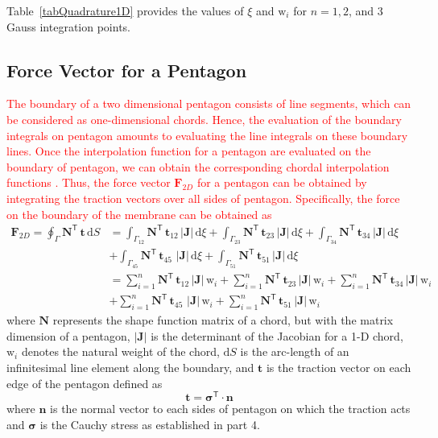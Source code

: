 Table~\ref{tabQuadrature1D} provides the values of $\xi$ and $\mathrm{w}_i$ for $n = 1, 2$, and $3$ Gauss integration points.

\subsection{Force Vector for a Pentagon}

\textcolor{red}{The boundary of a two dimensional pentagon consists of line segments, which can be considered as one-dimensional chords. Hence, the evaluation of the boundary integrals on pentagon amounts to evaluating the line integrals on these boundary lines. Once the interpolation function for a pentagon are evaluated on the boundary of pentagon, we can obtain the corresponding chordal interpolation functions \cite{Reddy93}.
    Thus, the force vector $\mathbf{F}_{2D}$  for a pentagon can be obtained by integrating the traction vectors over all sides of pentagon. Specifically, the force on the boundary of the membrane can be obtained as}
\begin{equation}
\begin{aligned}
\mathbf{F}_{2D}  = \oint_{\Gamma} \mathbf{N}^{\mathsf{T}} \, \mathbf{t} \, \mathrm{d} S & = \int_{\Gamma_{12}} \mathbf{N}^{\mathsf{T}} \, \mathbf{t}_{12} \,|\mathbf{J}| \, \mathrm{d} \xi + \int_{\Gamma_{23}} \mathbf{N}^{\mathsf{T}} \, \mathbf{t}_{23} \,|\mathbf{J}| \, \mathrm{d} \xi + \int_{\Gamma_{34}} \mathbf{N}^{\mathsf{T}} \, \mathbf{t}_{34} \,|\mathbf{J}| \, \mathrm{d} \xi \\
& + \int_{\Gamma_{45}} \mathbf{N}^{\mathsf{T}} \, \mathbf{t}_{45} \, \,|\mathbf{J}| \, \mathrm{d} \xi + \int_{\Gamma_{51}} \mathbf{N}^{\mathsf{T}} \, \mathbf{t}_{51} \,|\mathbf{J}| \, \mathrm{d} \xi \\
& = \sum_{i=1}^{n} \mathbf{N}^{\mathsf{T}} \, \mathbf{t}_{12} \,|\mathbf{J}| \, \mathrm{w}_i + \sum_{i=1}^{n} \mathbf{N}^{\mathsf{T}} \, \mathbf{t}_{23} \,|\mathbf{J}| \, \mathrm{w}_i + \sum_{i=1}^{n} \mathbf{N}^{\mathsf{T}} \, \mathbf{t}_{34} \,|\mathbf{J}| \, \mathrm{w}_i \\
& + \sum_{i=1}^{n} \mathbf{N}^{\mathsf{T}} \, \mathbf{t}_{45} \, \,|\mathbf{J}| \, \mathrm{w}_i + \sum_{i=1}^{n} \mathbf{N}^{\mathsf{T}} \, \mathbf{t}_{51} \,|\mathbf{J}| \, \mathrm{w}_i
\end{aligned}
\end{equation}
where $\mathbf{N}$ represents the shape function matrix of a chord, but with the matrix dimension of a pentagon, $|\mathbf{J}|$ is the determinant of the Jacobian for a 1-D chord, $\mathrm{w}_i$ denotes the natural weight of the chord, $\mathrm{d} S$ is the arc-length of an infinitesimal line element along the boundary, and $\mathbf{t}$ is the traction vector on each edge of the pentagon defined as
\begin{equation}
\mathbf{t} = \boldsymbol{\sigma}^{\mathsf{T}} \cdot \mathbf{n} 
\end{equation}
where $ \mathbf{n} $ is the normal vector to each sides of pentagon on which the traction acts and $ \boldsymbol{\sigma} $ is the Cauchy stress as established in part 4.

